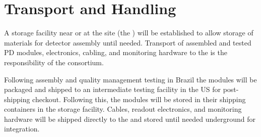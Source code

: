 \section{Transport and Handling}
\label{sec:fdsp-pd-install}


%


A storage facility near or at the  site (the ) will be established to allow storage of materials for detector assembly until needed.  Transport of assembled and tested PD modules, electronics, cabling, and monitoring hardware to the  is the responsibility of the  consortium.



Following assembly and quality management testing in Brazil the  modules  will be packaged and shipped to an intermediate testing facility in the US for post-shipping checkout. Following this, the modules will be stored in their shipping containers in the storage facility.  Cables, readout electronics, and monitoring hardware will be shipped directly to the  and stored until needed underground for integration.

